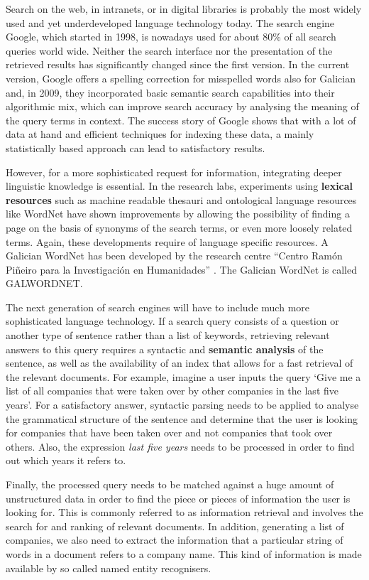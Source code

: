 \begin{multicols}{2}
   Search on the web, in intranets, or in digital libraries is probably the most widely used and yet underdeveloped language technology today. The search engine Google, which started in 1998, is nowadays used for about 80\% of all search queries world wide. Neither the search interface nor the presentation of the retrieved results has significantly changed since the first version. In the current version, Google offers a spelling correction for misspelled words also for Galician and, in 2009, they incorporated basic semantic search capabilities into their algorithmic mix, which can improve search accuracy by analysing the meaning of the query terms in context. The success story of Google shows that with a lot of data at hand and efficient techniques for indexing these data, a mainly statistically based approach can lead to satisfactory results. 

However, for a more sophisticated request for information, integrating deeper linguistic knowledge is essential. In the research labs, experiments using \textbf{lexical resources} such as machine readable thesauri and ontological language resources like WordNet have shown improvements by allowing the possibility of finding a page on the basis of synonyms of the search terms, or even more loosely related terms. Again, these developments require of language specific resources. A Galician WordNet has been developed by the research centre “Centro Ramón Piñeiro para la Investigación en Humanidades” \cite{GAL-Nota24}. The Galician WordNet is called GALWORDNET.

The next generation of search engines will have to include much more sophisticated language technology. If a search query consists of a question or another type of sentence rather than a list of keywords, retrieving relevant answers to this query requires a syntactic and \textbf{semantic analysis} of the sentence, as well as the availability of an index that allows for a fast retrieval of the relevant documents. For example, imagine a user inputs the query ‘Give me a list of all companies that were taken over by other companies in the last five years’. For a satisfactory answer, syntactic parsing needs to be applied to analyse the grammatical structure of the sentence and determine that the user is looking for companies that have been taken over and not companies that took over others. Also, the expression \textit{last five years} needs to be processed in order to find out which years it refers to. 

Finally, the processed query needs to be matched against a huge amount of unstructured data in order to find the piece or pieces of information the user is looking for. This is commonly referred to as information retrieval and involves the search for and ranking of relevant documents. In addition, generating a list of companies, we also need to extract the information that a particular string of words in a document refers to a company name. This kind of information is made available by so called named entity recognisers.


\end{multicols}
